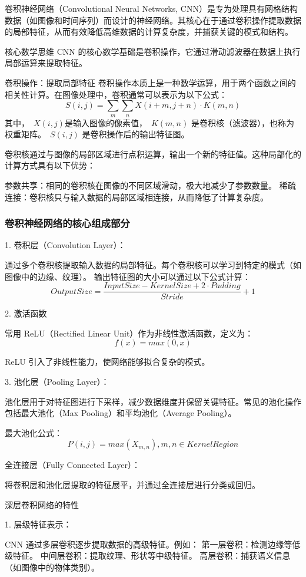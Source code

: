 {卷积神经网络（Convolutional Neural Networks, CNN）是专为处理具有网格结构数据（如图像和时间序列）而设计的神经网络。其核心在于通过卷积操作提取数据的局部特征，从而有效降低高维数据的计算复杂度，并捕获关键的模式和结构。

核心数学思维
CNN 的核心数学基础是卷积操作，它通过滑动滤波器在数据上执行局部运算来提取特征。

卷积操作：提取局部特征
卷积操作本质上是一种数学运算，用于两个函数之间的相关性计算。在图像处理中，卷积通常可以表示为以下公式：
$$𝑆(𝑖,𝑗)=\sum_{𝑚} \sum_𝑛 𝑋(𝑖+𝑚,𝑗+𝑛)
\cdot 𝐾(𝑚,𝑛)$$
其中，~$X(i,j) $是输入图像的像素值，~$K(m,n)$ 是卷积核（滤波器），也称为权重矩阵。~$S(i,j)$ 是卷积操作后的输出特征图。

卷积核通过与图像的局部区域进行点积运算，输出一个新的特征值。这种局部化的计算方式具有以下优势：

参数共享：相同的卷积核在图像的不同区域滑动，极大地减少了参数数量。
稀疏连接：卷积核只与输入数据的局部区域相连接，从而降低了计算复杂度。

\subsubsection*{卷积神经网络的核心组成部分}
1. 卷积层（Convolution Layer）：

通过多个卷积核提取输入数据的局部特征。每个卷积核可以学习到特定的模式（如图像中的边缘、纹理）。
输出特征图的大小可以通过以下公式计算：
$$
Output Size=
\frac{Input Size -Kernel Size+2\cdot Padding}{Stride}+1$$

2. 激活函数

常用 ReLU（Rectified Linear Unit）作为非线性激活函数，定义为：
$$
f(x)=max(0,x)$$

ReLU 引入了非线性能力，使网络能够拟合复杂的模式。

3. 池化层（Pooling Layer）：

池化层用于对特征图进行下采样，减少数据维度并保留关键特征。常见的池化操作包括最大池化（Max Pooling）和平均池化（Average Pooling）。

最大池化公式：
$$P(i,j)=max(X_{m,n}) ,m,n\in Kernel Region$$

全连接层（Fully Connected Layer）：

将卷积层和池化层提取的特征展平，并通过全连接层进行分类或回归。

深层卷积网络的特性

1. 层级特征表示：

CNN 通过多层卷积逐步提取数据的高级特征。例如：
第一层卷积：检测边缘等低级特征。
中间层卷积：提取纹理、形状等中级特征。
高层卷积：捕获语义信息（如图像中的物体类别）。

}
